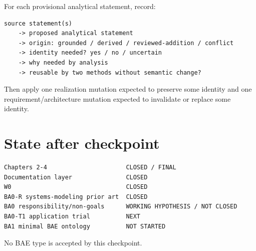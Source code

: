 \documentclass[10pt,a4paper]{article}
\begin{document}
For each provisional analytical statement, record:
\begin{lstlisting}
source statement(s)
    -> proposed analytical statement
    -> origin: grounded / derived / reviewed-addition / conflict
    -> identity needed? yes / no / uncertain
    -> why needed by analysis
    -> reusable by two methods without semantic change?
\end{lstlisting}
Then apply one realization mutation expected to preserve some identity and one requirement/architecture mutation expected to invalidate or replace some identity.

\section{State after checkpoint}
\begin{lstlisting}
Chapters 2-4                      CLOSED / FINAL
Documentation layer               CLOSED
W0                                CLOSED
BA0-R systems-modeling prior art  CLOSED
BA0 responsibility/non-goals      WORKING HYPOTHESIS / NOT CLOSED
BA0-T1 application trial          NEXT
BA1 minimal BAE ontology          NOT STARTED
\end{lstlisting}

No BAE type is accepted by this checkpoint.
\end{document}
